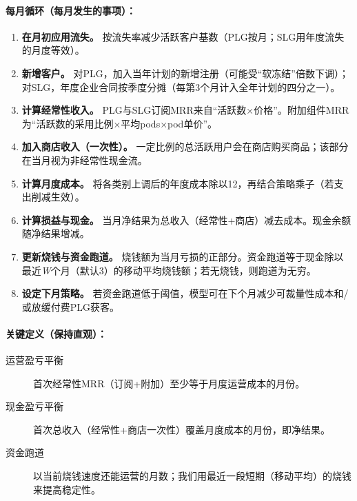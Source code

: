 \documentclass[11pt, a4paper, oneside]{article}
\begin{document}
\paragraph{每月循环（每月发生的事项）：}
\begin{enumerate}
\item \textbf{在月初应用流失。} 按流失率减少活跃客户基数（PLG按月；SLG用年度流失的月度等效）。
\item \textbf{新增客户。} 对PLG，加入当年计划的新增注册（可能受“软冻结”倍数下调）；对SLG，年度企业合同按季度分摊（每第3个月计入全年计划的四分之一）。
\item \textbf{计算经常性收入。} PLG与SLG订阅MRR来自“活跃数×价格”。附加组件MRR为“活跃数的采用比例×平均pods×pod单价”。
\item \textbf{加入商店收入（一次性）。} 一定比例的总活跃用户会在商店购买商品；该部分在当月视为非经常性现金流。
\item \textbf{计算月度成本。} 将各类别上调后的年度成本除以12，再结合策略乘子（若支出削减生效）。
\item \textbf{计算损益与现金。} 当月净结果为总收入（经常性+商店）减去成本。现金余额随净结果增减。
\item \textbf{更新烧钱与资金跑道。} 烧钱额为当月亏损的正部分。资金跑道等于现金除以最近\emph{W}个月（默认3）的移动平均烧钱额；若无烧钱，则跑道为无穷。
\item \textbf{设定下月策略。} 若资金跑道低于阈值，模型可在下个月减少可裁量性成本和/或放缓付费PLG获客。
\end{enumerate}


\paragraph{关键定义（保持直观）：}
\begin{description}
\item[运营盈亏平衡] 首次经常性MRR（订阅+附加）至少等于月度运营成本的月份。
\item[现金盈亏平衡] 首次总收入（经常性+商店一次性）覆盖月度成本的月份，即净结果。
\item[资金跑道] 以当前烧钱速度还能运营的月数；我们用最近一段短期（移动平均）的烧钱来提高稳定性。
\end{description}
\end{document}
